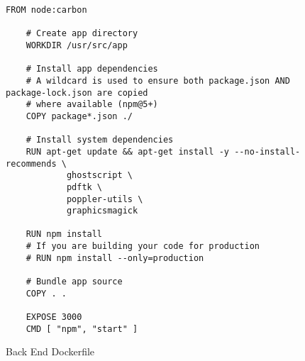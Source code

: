 \begin{figure}[h!]
    \begin{lstlisting}[basicstyle=\small]
    FROM node:carbon

    # Create app directory
    WORKDIR /usr/src/app

    # Install app dependencies
    # A wildcard is used to ensure both package.json AND package-lock.json are copied
    # where available (npm@5+)
    COPY package*.json ./

    # Install system dependencies
    RUN apt-get update && apt-get install -y --no-install-recommends \
    		ghostscript \
    		pdftk \
    		poppler-utils \
    		graphicsmagick

    RUN npm install
    # If you are building your code for production
    # RUN npm install --only=production

    # Bundle app source
    COPY . .

    EXPOSE 3000
    CMD [ "npm", "start" ]
  \end{lstlisting}
  \caption{Back End Dockerfile}
  \label{sample:finalserverdocker}
\end{figure}
